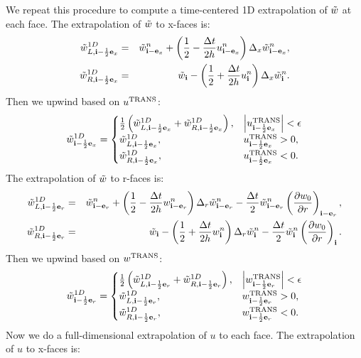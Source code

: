 We repeat this procedure to compute a time-centered 1D extrapolation
of $\tilde{w}$ at each face.  The extrapolation of $\tilde{w}$ to x-faces is:
\begin{eqnarray}
\tilde{w}_{L,{\bf i}-\frac{1}{2}{\bf e}_x}^{1D} &=& \tilde{w}_{{\bf i}-{\bf e}_x}^n + \left(\frac{1}{2} - \frac{\Delta t}{2h}u_{{\bf i}-{\bf e}_x}^n\right)\Delta_x \tilde{w}_{{\bf i}-{\bf e}_x}^n, \\
\tilde{w}_{R,{\bf i}-\frac{1}{2}{\bf e}_x}^{1D} &=& \tilde{w}_{{\bf i}} - \left(\frac{1}{2} + \frac{\Delta t}{2h}u_{{\bf i}}^n\right)\Delta_x \tilde{w}_{{\bf i}}^n.
\end{eqnarray}
Then we upwind based on $u^{\rm TRANS}$:
\begin{equation}
\tilde{w}_{{\bf i}-\frac{1}{2}{\bf e}_x}^{1D} =
\begin{cases}
\frac{1}{2}\left(\tilde{w}_{L,{\bf i}-\frac{1}{2}{\bf e}_x}^{1D} + \tilde{w}_{R,{\bf i}-\frac{1}{2}{\bf e}_x}^{1D}\right), & \left|u^{\rm TRANS}_{{\bf i}-\frac{1}{2}{\bf e}_x}\right| < \epsilon \\
\tilde{w}_{L,{\bf i}-\frac{1}{2}{\bf e}_x}^{1D}, & u^{\rm TRANS}_{{\bf i}-\frac{1}{2}{\bf e}_x} > 0, \\
\tilde{w}_{R,{\bf i}-\frac{1}{2}{\bf e}_x}^{1D}, & u^{\rm TRANS}_{{\bf i}-\frac{1}{2}{\bf e}_x} < 0. \\
\end{cases}
\end{equation}
The extrapolation of $\tilde{w}$ to r-faces is:
\begin{eqnarray}
\tilde{w}_{L,{\bf i}-\frac{1}{2}{\bf e}_r}^{1D} &=& \tilde{w}_{{\bf i}-{\bf e}_r}^n + \left(\frac{1}{2} - \frac{\Delta t}{2h}w_{{\bf i}-{\bf e}_r}^n\right)\Delta_r \tilde{w}_{{\bf i}-{\bf e}_r}^n - \frac{\Delta t}{2}\tilde{w}_{{\bf i}-{\bf e}_r}^n\left(\frac{\partial w_0}{\partial r}\right)_{{\bf i}-{\bf e}_r}, \label{1D wt_L extrap} \\
\tilde{w}_{R,{\bf i}-\frac{1}{2}{\bf e}_r}^{1D} &=& \tilde{w}_{{\bf i}} - \left(\frac{1}{2} + \frac{\Delta t}{2h}w_{{\bf i}}^n\right)\Delta_r \tilde{w}_{{\bf i}}^n - \frac{\Delta t}{2}\tilde{w}_{{\bf i}}^n\left(\frac{\partial w_0}{\partial r}\right)_{{\bf i}}. \label{1D wt_R extrap}
\end{eqnarray}
Then we upwind based on $w^{\rm TRANS}$:
\begin{equation}
\tilde{w}_{{\bf i}-\frac{1}{2}{\bf e}_r}^{1D} =
\begin{cases}
\frac{1}{2}\left(\tilde{w}_{L,{\bf i}-\frac{1}{2}{\bf e}_r}^{1D} + \tilde{w}_{R,{\bf i}-\frac{1}{2}{\bf e}_r}^{1D}\right), & \left|w^{\rm TRANS}_{{\bf i}-\frac{1}{2}{\bf e}_r}\right| < \epsilon \\
\tilde{w}_{L,{\bf i}-\frac{1}{2}{\bf e}_r}^{1D}, & w^{\rm TRANS}_{{\bf i}-\frac{1}{2}{\bf e}_r} > 0, \\
\tilde{w}_{R,{\bf i}-\frac{1}{2}{\bf e}_r}^{1D}, & w^{\rm TRANS}_{{\bf i}-\frac{1}{2}{\bf e}_r} < 0. \\
\end{cases}
\end{equation}
Now we do a full-dimensional extrapolation of $u$ to each face.  The
extrapolation of $u$ to x-faces is:
